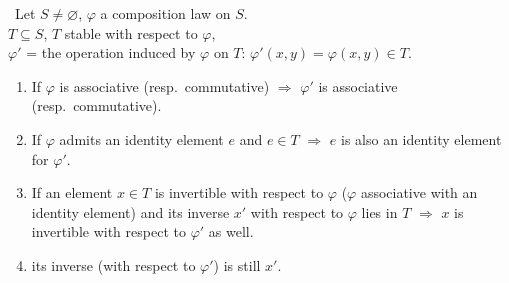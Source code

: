 \documentclass[12pt]{article}
\begin{document}
\bigskip
\noindent{} \ Let $S\neq\varnothing$, $\varphi$ a composition law on $S$.\\
$T\subseteq S$, $T$ stable with respect to $\varphi$,\\
$\varphi'$ = the operation induced by $\varphi$ on $T$: $\varphi'(x,y)=\varphi(x,y)\in T$.

\begin{enumerate}
\item[(1)] If $\varphi$ is associative (resp.\ commutative) $\Rightarrow$ $\varphi'$ is associative (resp.\ commutative).
\item[(2)] If $\varphi$ admits an identity element $e$ and $e\in T$ $\Rightarrow$ $e$ is also an identity element for $\varphi'$.
\item[(3)] If an element $x\in T$ is invertible with respect to $\varphi$ ($\varphi$ associative with an identity element) and its inverse $x'$ with respect to $\varphi$ lies in $T$ $\Rightarrow$ $x$ is invertible with respect to $\varphi'$ as well.
\item[(4)] its inverse (with respect to $\varphi'$) is still $x'$.
\end{enumerate}
\end{document}
